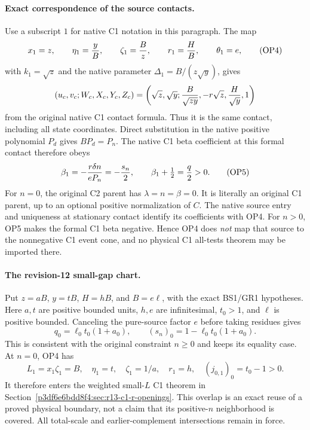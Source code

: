 \paragraph{Exact correspondence of the source contacts.}
Use a subscript $1$ for native C1 notation in this paragraph. The map
\[
 x_1=z,\qquad \eta_1={y\over B},\qquad
 \zeta_1={B\over z},\qquad r_1={H\over B},\qquad
 \theta_1=e,
 \tag{OP4}
\]
with $k_1=\sqrt z$ and the native parameter
$\Delta_1=B/(z\sqrt y)$, gives
\[
 (u_c,v_c;W_c,X_c,Y_c,Z_c)
 =\left(\sqrt z,\sqrt y;{B\over\sqrt{zy}},
                       -r\sqrt z,{H\over\sqrt y},1\right)
\]
from the original native C1 contact formula. Thus it is the same
contact, including all state coordinates. Direct substitution in the
native positive polynomial $P_d$ gives $BP_d=P_n$.
The native C1 beta coefficient at this formal contact therefore obeys
\[
 \beta_1=-{r\delta n\over eP_n}=-{s_n\over2},
 \qquad \beta_1+\tfrac12={q\over2}>0.                 \tag{OP5}
\]
For $n=0$, the original C2 parent has
$\lambda=n=\beta=0$. It is literally an original C1 parent,
up to an optional positive normalization of $C$. The native source
entry and uniqueness at stationary contact identify its coefficients
with OP4. For $n>0$, OP5 makes the formal C1 beta negative. Hence
OP4 does \emph{not} map that source to the nonnegative C1 event cone,
and no physical C1 all-tests theorem may be imported there.

\paragraph{The revision-12 small-gap chart.}
Put $z=aB$, $y=tB$, $H=hB$, and $B=e\ell$, with the exact
BS1/GR1 hypotheses. Here $a,t$ are positive bounded units,
$h,e$ are infinitesimal, $t_0>1$, and $\ell$ is positive bounded.
Canceling the pure-source factor $e$ before taking residues gives
\[
 q_0=\ell_0t_0(1+a_0),\qquad
 (s_n)_0=1-\ell_0t_0(1+a_0).                          \tag{OP6}
\]
This is consistent with the original constraint $n\ge0$ and keeps
its equality case. At $n=0$, OP4 has
\[
 L_1=x_1\zeta_1=B,\quad
 \eta_1=t,\quad\zeta_1=1/a,\quad r_1=h,\quad
 (j_{0,1})_0=t_0-1>0.
\]
It therefore enters the weighted small-$L$ C1 theorem in
Section~\ref{p3df6e6bdd8f4:sec:r13-c1-r-openings}. This overlap is an exact reuse
of a proved physical boundary, not a claim that its positive-$n$
neighborhood is covered. All total-scale and earlier-complement
intersections remain in force.
